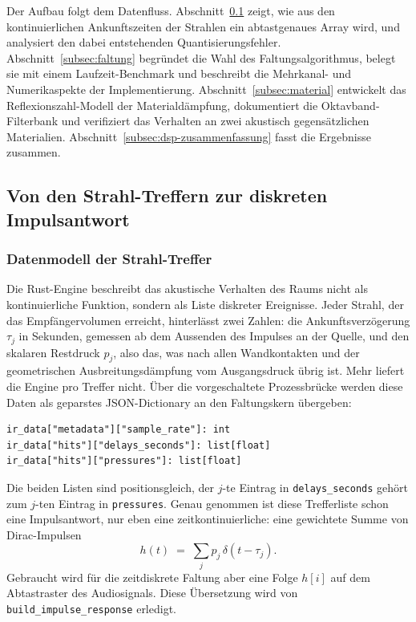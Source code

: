 Der Aufbau folgt dem Datenfluss. Abschnitt~\ref{subsec:build-ir} zeigt, wie aus
den kontinuierlichen Ankunftszeiten der Strahlen ein abtastgenaues Array wird,
und analysiert den dabei entstehenden Quantisierungsfehler.
Abschnitt~\ref{subsec:faltung} begründet die Wahl des Faltungsalgorithmus,
belegt sie mit einem Laufzeit-Benchmark und beschreibt die Mehrkanal- und
Numerikaspekte der Implementierung. Abschnitt~\ref{subsec:material} entwickelt
das Reflexionszahl-Modell der Materialdämpfung, dokumentiert die
Oktavband-Filterbank und verifiziert das Verhalten an zwei akustisch
gegensätzlichen Materialien. Abschnitt~\ref{subsec:dsp-zusammenfassung} fasst
die Ergebnisse zusammen.

\subsection{Von den Strahl-Treffern zur diskreten Impulsantwort}
\label{subsec:build-ir}

\subsubsection{Datenmodell der Strahl-Treffer}
\label{subsubsec:datenmodell}

Die Rust-Engine beschreibt das akustische Verhalten des Raums nicht als
kontinuierliche Funktion, sondern als Liste diskreter Ereignisse. Jeder Strahl,
der das Empfängervolumen erreicht, hinterlässt zwei Zahlen: die
Ankunftsverzögerung $\tau_j$ in Sekunden, gemessen ab dem Aussenden des
Impulses an der Quelle, und den skalaren Restdruck $p_j$, also das, was nach
allen Wandkontakten und der geometrischen Ausbreitungsdämpfung vom
Ausgangsdruck übrig ist. Mehr liefert die Engine pro Treffer nicht.
Über die vorgeschaltete Prozessbrücke werden diese Daten als geparstes JSON-Dictionary an den Faltungskern übergeben:


\begin{lstlisting}[style=cemdsp, caption={Erwartetes Schema des Engine-Ergebnisses (Auszug aus dem Docstring von \texttt{convolve}).}, label={lst:schema}]
ir_data["metadata"]["sample_rate"]: int
ir_data["hits"]["delays_seconds"]: list[float]
ir_data["hits"]["pressures"]: list[float]
\end{lstlisting}

Die beiden Listen sind positionsgleich, der $j$-te Eintrag in
\texttt{delays\_seconds} gehört zum $j$-ten Eintrag in \texttt{pressures}.
Genau genommen ist diese Trefferliste schon eine Impulsantwort, nur eben eine
zeitkontinuierliche: eine gewichtete Summe von Dirac-Impulsen
\[
    h(t) \;=\; \sum_{j} p_j \,\delta(t - \tau_j).
\]
Gebraucht wird für die zeitdiskrete Faltung aber eine Folge
$h[i]$ auf dem Abtastraster des Audiosignals.
Diese Übersetzung wird von \texttt{build\_impulse\_response} erledigt.

